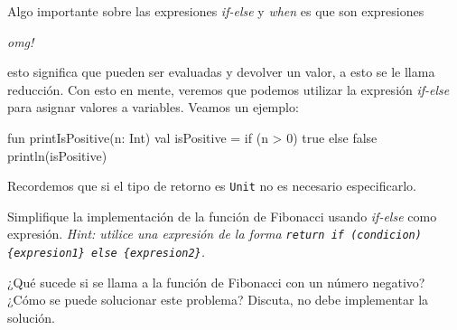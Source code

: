   Algo importante sobre las expresiones \textit{if-else} y \textit{when} es que son expresiones

  \begin{center}
    \textit{omg!}
  \end{center}

  esto significa que pueden ser evaluadas y devolver un valor, a esto se le llama reducción.
  Con esto en mente, veremos que podemos utilizar la expresión \textit{if-else} para asignar
  valores a variables.
  Veamos un ejemplo:

  \begin{kotlin}
    fun printIsPositive(n: Int) {
      val isPositive = if (n > 0) {
        true
      } else {
        false
      }
      println(isPositive)
    }
  \end{kotlin}

  Recordemos que si el tipo de retorno es \texttt{Unit} no es necesario especificarlo.

  \begin{exercise}
    Simplifique la implementación de la función de Fibonacci usando \textit{if-else} como 
    expresión.
    \textit{Hint: utilice una expresión de la forma \texttt{return if (condicion) \{expresion1\} 
    else \{expresion2\}}.}
  \end{exercise}

  \begin{exercise}
    ¿Qué sucede si se llama a la función de Fibonacci con un número negativo?
    ¿Cómo se puede solucionar este problema?
    Discuta, no debe implementar la solución.
  \end{exercise}